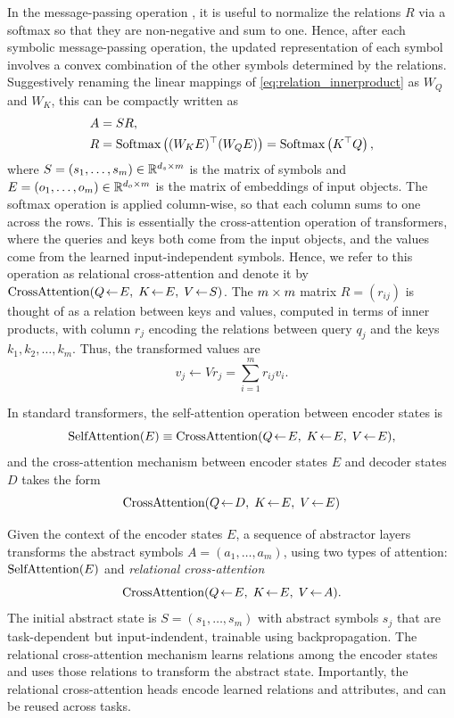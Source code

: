 In the message-passing operation , it is useful to normalize the relations $R$ via a softmax so that they are non-negative and sum to one. Hence, after each symbolic message-passing operation, the updated representation of each symbol involves a convex combination of the other symbols determined by the relations. Suggestively renaming the linear mappings of \eqref{eq:relation_innerproduct} as $W_Q$ and $W_K$, this can be compactly written as
\begin{equation}
    \label{eq:relational_crossattention}
    \begin{split}
        A &= S R, \\
        R &= \Softmax\left((W_K E)^\top (W_Q E)\right) = \Softmax\left(K^\top Q\right),
    \end{split}
\end{equation}
where $S = (s_1, \ldots, s_m) \in \mathbb{R}^{d_s \times m}$ is the matrix of symbols and $E
= (o_1, \ldots, o_m) \in \mathbb{R}^{d_o \times m}$ is the matrix of embeddings of input objects. 
The softmax operation is applied column-wise, so that each column sums to one across the rows.
This is essentially the cross-attention operation of transformers, where the queries and keys both come from the input objects, and the values come from the learned input-independent symbols. Hence, we refer to this operation as relational cross-attention and denote it by $\mbox{CrossAttention}(Q\!\leftarrow\!E,\; K\!\leftarrow\!E,\; V\!\leftarrow\!S)$. 
The $m\times m$ matrix $R = (r_{ij})$ is thought of 
as a relation between keys and values, computed in terms of inner products, with column $r_j$ 
encoding the relations between query $q_j$ and the keys $k_1, k_2, \ldots, k_m$. Thus, the transformed 
values are 
\begin{equation*}
    v_j \leftarrow V r_j = \sum_{i=1}^m r_{ij} v_i .
\end{equation*}

In standard transformers, the self-attention operation between encoder 
states is 
\begin{equation*}
    \selfattention{E} \equiv \crossattention{E}{E}{E},
\end{equation*} 
and the cross-attention mechanism between encoder states $E$ and decoder states $D$ takes the form 
\begin{equation*}
     \qkv{D}{E}{E}
\end{equation*}

Given the context of the encoder states $E$, a sequence of abstractor layers transforms the abstract symbols $A = (a_1,\ldots, a_m)$, using two types of attention: $\mbox{SelfAttention}(E)$ and 
\textit{relational cross-attention}
\begin{equation*}
    \qkv{E}{E}{A}.
\end{equation*}
The initial abstract state is $S = (s_1,\ldots, s_m)$
with abstract symbols $s_j$ that are task-dependent but input-indendent, trainable using
backpropagation. The relational cross-attention mechanism learns relations among the encoder states and uses those
relations to transform the abstract state. Importantly, the relational cross-attention heads
encode learned relations and attributes, and can be reused across tasks.


